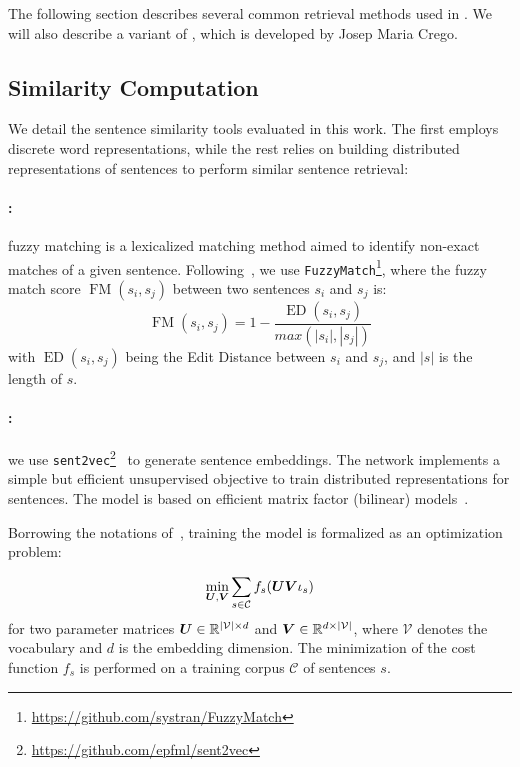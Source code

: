 The following section describes several common retrieval methods used in \citet{bapna19non,bulte19neural,xu20boosting,Farajian17multidomain}. We will also describe a variant of \citet{pagliardini18unsupervised}, which is developed by Josep Maria Crego.
\subsection{Similarity Computation}
\label{ssec:sim-chap8}
We detail the sentence similarity tools evaluated in this work. The first employs discrete word representations, while the rest relies on building distributed representations of sentences to perform similar sentence retrieval:

\paragraph{:} fuzzy matching is a lexicalized matching method aimed to identify non-exact matches of a given sentence. Following~\citet{xu20boosting}, we use \texttt{FuzzyMatch}\footnote{\url{https://github.com/systran/FuzzyMatch}}, where the fuzzy match score $\operatorname{FM} (s_i,s_j)$ between two sentences $s_i$ and $s_j$ is:
    \begin{equation*}
    \operatorname{FM} (s_i,s_j) = 1 - \frac{\operatorname{ED} (s_i,s_j)}{max(|s_i|,|s_j|)}
    \label{eq:FM-chap8}
    \end{equation*}
    \noindent with $\operatorname{ED}(s_i,s_j)$ being the Edit Distance between $s_i$ and $s_j$, and $|s|$ is the length of $s$. 
\paragraph{:} we use \texttt{sent2vec}\footnote{\url{https://github.com/epfml/sent2vec}}~\citep{pagliardini18unsupervised} to generate sentence embeddings. The network implements a simple but efficient unsupervised objective to train distributed representations for sentences. 
The model is based on efficient matrix factor (bilinear) models~\citep{Mikolov13efficient,Mikolov13distributed,Pennington14glove}.

Borrowing the notations of~\citet{pagliardini18unsupervised}, training the model is formalized as an optimization problem:

\begin{equation*}
\min_{\boldsymbol{U},\boldsymbol{V}} \sum_{s\in \mathcal{C}} f_{s} (\boldsymbol{UV}\iota_{s})
\end{equation*}
\noindent 
for two parameter matrices $\boldsymbol{U} \in \mathbb{R}^{|\mathcal{V}|\times d}$ and $\boldsymbol{V} \in \mathbb{R} ^{d\times |\mathcal{V}|}$, where $\mathcal{V}$ denotes the vocabulary and $d$ is the embedding dimension. The minimization of the cost function $f_{s}$ is performed on a training corpus $\mathcal{C}$ of sentences $s$.

